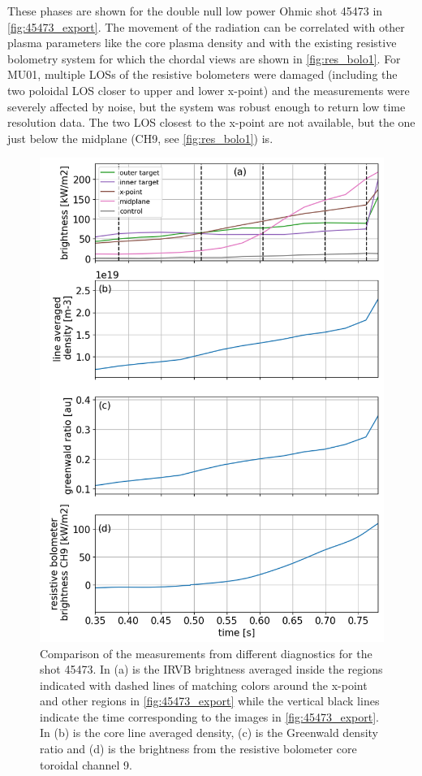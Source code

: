 These phases are shown for the double null low power Ohmic shot 45473 in \autoref{fig:45473_export}. The movement of the radiation can be correlated with other plasma parameters like the core plasma density and with the existing resistive bolometry system for which the chordal views are shown in \autoref{fig:res_bolo1}. For MU01, multiple LOSs of the resistive bolometers were damaged (including the two poloidal LOS closer to upper and lower x-point) and the measurements were severely affected by noise, but the system was robust enough to return low time resolution data. The two LOS closest to the x-point are not available, but the one just below the midplane (CH9, see \autoref{fig:res_bolo1}) is.%

\begin{figure}[!ht]
	\centering
	\includegraphics[width=0.7\linewidth,trim={15 0 0 0},clip]{Chapters/chapter2/figs/45473_for_paper.png}
	\caption{Comparison of the measurements from different diagnostics for the shot 45473. In (a) is the IRVB brightness averaged inside the regions indicated with dashed lines of matching colors around the x-point and other regions in \autoref{fig:45473_export} while the vertical black lines indicate the time corresponding to the images in \autoref{fig:45473_export}. In (b) is the core line averaged density, (c) is the Greenwald density ratio and (d) is the brightness from the resistive bolometer core toroidal channel 9.}
	\label{fig:45473_plots}
\end{figure}

